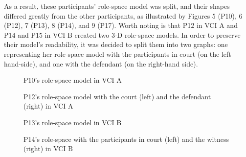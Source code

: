 \documentclass[output=paper]{langsci/langscibook}
\begin{document}
As a result, these participants’ role-space model was split, and their shapes differed greatly from the other participants, as illustrated by Figures 5 (P10), 6 (P12), 7 (P13), 8 (P14), and 9 (P17). Worth noting is that P12 in \textsc{VCI} A and P14 and P15 in \textsc{VCI} B created two 3-D role-space models. In order to preserve their model’s readability, it was decided to split them into two graphs: one representing her role-space model with the participants in court (on the left hand-side), and one with the defendant (on the right-hand side).

  

 

\begin{figure}
\caption{P10's role-space model in \textsc{VCI} A}
\end{figure}


  
   
 


\begin{figure}
\caption{P12’s role-space model with the court (left) and the defendant (right) in \textsc{VCI} A}
\end{figure}

  
 

\begin{figure}
\caption{P13's role-space model in \textsc{VCI} B}
\end{figure}

  
   
 

\begin{figure}
\caption{P14's role-space with the participants in court (left) and the witness (right) in \textsc{VCI} B}
\end{figure}
\end{document}
